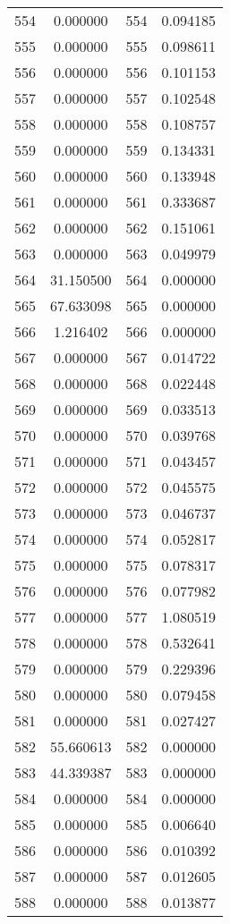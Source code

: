 \documentclass[12pt]{article}
\begin{document}
\begin{longtable}{@{}cccc@{}}
554 & 0.000000 & 554 & 0.094185 \\
555 & 0.000000 & 555 & 0.098611 \\
556 & 0.000000 & 556 & 0.101153 \\
557 & 0.000000 & 557 & 0.102548 \\
558 & 0.000000 & 558 & 0.108757 \\
559 & 0.000000 & 559 & 0.134331 \\
560 & 0.000000 & 560 & 0.133948 \\
561 & 0.000000 & 561 & 0.333687 \\
562 & 0.000000 & 562 & 0.151061 \\
563 & 0.000000 & 563 & 0.049979 \\
564 & 31.150500 & 564 & 0.000000 \\
565 & 67.633098 & 565 & 0.000000 \\
566 & 1.216402 & 566 & 0.000000 \\
567 & 0.000000 & 567 & 0.014722 \\
568 & 0.000000 & 568 & 0.022448 \\
569 & 0.000000 & 569 & 0.033513 \\
570 & 0.000000 & 570 & 0.039768 \\
571 & 0.000000 & 571 & 0.043457 \\
572 & 0.000000 & 572 & 0.045575 \\
573 & 0.000000 & 573 & 0.046737 \\
574 & 0.000000 & 574 & 0.052817 \\
575 & 0.000000 & 575 & 0.078317 \\
576 & 0.000000 & 576 & 0.077982 \\
577 & 0.000000 & 577 & 1.080519 \\
578 & 0.000000 & 578 & 0.532641 \\
579 & 0.000000 & 579 & 0.229396 \\
580 & 0.000000 & 580 & 0.079458 \\
581 & 0.000000 & 581 & 0.027427 \\
582 & 55.660613 & 582 & 0.000000 \\
583 & 44.339387 & 583 & 0.000000 \\
584 & 0.000000 & 584 & 0.000000 \\
585 & 0.000000 & 585 & 0.006640 \\
586 & 0.000000 & 586 & 0.010392 \\
587 & 0.000000 & 587 & 0.012605 \\
588 & 0.000000 & 588 & 0.013877 \\

\end{longtable}
\end{document}
